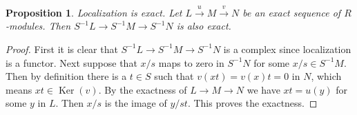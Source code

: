 \documentclass[10pt,a4paper]{amsart}
\newenvironment{slogan}{\comment}{\endcomment}
\theoremstyle{plain}
\newtheorem{proposition}[subsection]{Proposition}
\theoremstyle{definition}
\theoremstyle{remark}
\numberwithin{equation}{subsection}
\def\Ker{\mathop{\mathrm{Ker}}}
\begin{document}
\begin{proposition}
\label{proposition-localization-exact}
\begin{slogan}
Localization is exact.
\end{slogan}
Let $L\xrightarrow{u} M\xrightarrow{v} N$ be an exact sequence
of $R$-modules. Then
$S^{-1}L \to S^{-1}M \to S^{-1}N$ is also exact.
\end{proposition}

\begin{proof}
First it is clear that $S^{-1}L \to S^{-1}M \to S^{-1}N$ is a complex
since localization is a functor. Next suppose that $x/s$ maps to zero
in $S^{-1}N$ for some $x/s \in S^{-1}M$. Then by definition there is a
$t\in S$ such that $v(xt) = v(x)t = 0$ in $N$, which means
$xt \in \Ker(v)$. By the exactness of $L \to M \to N$ we have
$xt = u(y)$ for some $y$ in $L$. Then $x/s$ is the image of $y/st$.
This proves the exactness.
\end{proof}
\end{document}
